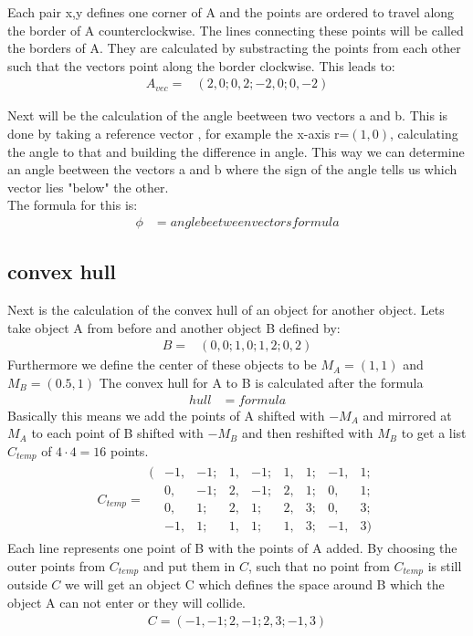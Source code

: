 Each pair x,y defines one corner of A and the points are ordered to travel along the border of A counterclockwise.
The lines connecting these points will be called the borders of A. They are calculated by substracting the points from each other such that the vectors point along the border clockwise. This leads to:
\begin{align*}
A_{vec} = 	&( 2 , 0 ; 0 ,2 ;-2, 0; 0, -2)	
\end{align*}

Next will be the calculation of the angle beetween two vectors a and b. This is done by taking a reference vector , for example the x-axis r=$(1,0)$, calculating the angle to that and building the difference in angle. This way we can determine an angle beetween the vectors a and b where the sign of the angle tells us which vector lies "below" the other.\\
The formula for this is:
\begin{align*}
  \phi &= angle beetween vectors formula
\end{align*}

\subsection{convex hull} %
Next is the calculation of the convex hull of an object for another object. Lets take object A from before and another object B defined by:
\begin{align*}
B = 	&( 0 , 0 ;1 , 0 ;1, 2; 0, 2)	
\end{align*}
Furthermore we define the center of these objects to be $M_A = (1,1)$ and $M_B = (0.5 , 1)$
The convex hull for A to B is calculated after the formula
\begin{align*}
	hull &= formula
\end{align*}
Basically this means we add the points of A shifted with $-M_A$ and mirrored at $M_A$ to each point of B shifted with $-M_B$ and then reshifted with $M_B$ to get a list $C_{temp}$ of $4\cdot 4 = 16$  points.
\begin{align*}
C_{temp} =	\begin{matrix}
		(&-1, &-1; &1, &-1; &1, &1; &-1, &1;\\
		&0, &-1; &2, &-1; &2, &1; &0, &1;\\
		&0, &1; &2, &1; &2, &3; &0, &3;\\
		&-1, &1; &1, &1; &1, &3; &-1, &3)
		\end{matrix}
\end{align*}
Each line represents one point of B with the points of A added. By choosing the outer points from $C_{temp}$ and put them in $C$, such that no point from $C_{temp}$ is still outside $C$  we will get an object C which defines the space around B which the object A can not enter or they will collide.
\begin{align*}
C = (-1,-1; 2, -1; 2 ,3; -1, 3)
\end{align*}


